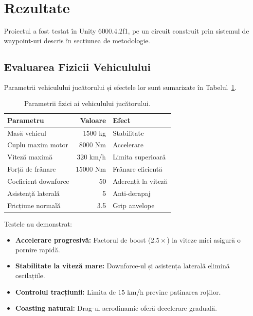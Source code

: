 \section{Rezultate}
\label{sec:results}

Proiectul a fost testat în Unity 6000.4.2f1, pe un circuit construit prin sistemul de waypoint-uri descris în secțiunea de metodologie.

\subsection{Evaluarea Fizicii Vehiculului}

Parametrii vehiculului jucătorului și efectele lor sunt sumarizate în Tabelul~\ref{tab:vehicle_params}.

\begin{table}[h]
\centering
\small
\begin{tabular}{lrl}
\toprule
\textbf{Parametru} & \textbf{Valoare} & \textbf{Efect} \\
\midrule
Masă vehicul & 1500 kg & Stabilitate \\
Cuplu maxim motor & 8000 Nm & Accelerare \\
Viteză maximă & 320 km/h & Limita superioară \\
Forță de frânare & 15000 Nm & Frânare eficientă \\
Coeficient downforce & 50 & Aderență la viteză \\
Asistență laterală & 5 & Anti-derapaj \\
Fricțiune normală & 3.5 & Grip anvelope \\
\bottomrule
\end{tabular}
\caption{Parametrii fizici ai vehiculului jucătorului.}
\label{tab:vehicle_params}
\end{table}

Testele au demonstrat:
\begin{itemize}
    \item \textbf{Accelerare progresivă:} Factorul de boost ($2.5\times$) la viteze mici asigură o pornire rapidă.
    \item \textbf{Stabilitate la viteză mare:} Downforce-ul și asistența laterală elimină oscilațiile.
    \item \textbf{Controlul tracțiunii:} Limita de 15 km/h previne patinarea roților.
    \item \textbf{Coasting natural:} Drag-ul aerodinamic oferă decelerare graduală.
\end{itemize}

